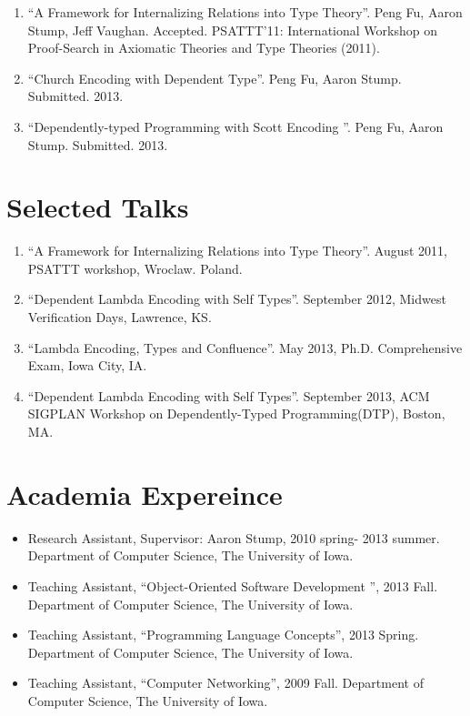 \documentclass[10pt]{article}
\begin{document}
\begin{enumerate}
\item ``A Framework for Internalizing Relations into Type Theory''. Peng Fu, Aaron Stump, Jeff Vaughan. Accepted. PSATTT'11: International Workshop on Proof-Search in Axiomatic Theories and Type Theories (2011). 
\item ``Church Encoding with Dependent Type''. Peng Fu, Aaron Stump. Submitted. 2013.
\item ``Dependently-typed Programming with Scott Encoding ''. Peng Fu, Aaron Stump. Submitted. 2013.
  
\end{enumerate}

\section*{Selected Talks}

\begin{enumerate}

\item ``A Framework for Internalizing Relations into Type Theory''. August 2011, PSATTT workshop, Wroclaw. Poland. 
\item ``Dependent Lambda Encoding with Self Types''. September 2012, Midwest Verification Days, Lawrence, KS.
\item ``Lambda Encoding, Types and Confluence''. May 2013, Ph.D. Comprehensive Exam, Iowa City, IA.
\item ``Dependent Lambda Encoding with Self Types''. September 2013, ACM SIGPLAN Workshop on Dependently-Typed Programming(DTP), Boston, MA.
\end{enumerate}

\section*{Academia Expereince}

\begin{itemize}
\item Research Assistant, Supervisor: Aaron Stump, 2010 spring- 2013 summer. Department of Computer Science, The University of Iowa.
\item Teaching Assistant,  ``Object-Oriented Software Development '', 2013 Fall. Department of Computer Science, The University of Iowa.
\item Teaching Assistant,  ``Programming Language Concepts'', 2013 Spring. Department of Computer Science, The University of Iowa.
  \item Teaching Assistant, ``Computer Networking'', 2009 Fall. Department of Computer Science, The University of Iowa.
\end{itemize}
\end{document}
